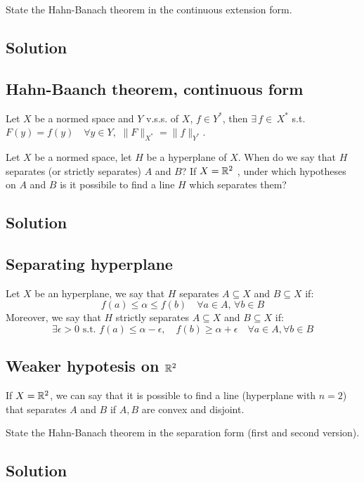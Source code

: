 
\question
State the Hahn-Banach theorem in the continuous extension form.

\subsection*{Solution}

\subsection{Hahn-Baanch theorem, continuous form}
Let $X$ be a normed space and $Y$ v.s.s. of $X$, $f \in Y^*$, then $\exists\,f \in\, X^* $ s.t. $F(y)=f(y)\quad \forall y\in Y$, $\,\|F\|_{X^*}=\|f\|_{Y^*}$. 


\question
Let $X$ be a normed space, let $H$ be a hyperplane of $X$. When do we say that $H$ separates (or strictly separates) $A$ and $B$? If $X = \mathbb{R}^2$ , under which hypotheses on $A$ and $B$ is it possibile to find a line $H$ which separates them?

\subsection*{Solution}

\subsection{Separating hyperplane}
Let $X$ be an hyperplane, we say that $H$ separates $A \subseteq X$ and $B\subseteq X$ if:
\[
f(a) \le \alpha \le f(b) \quad\forall a\in A,\,\forall b \in B
\]
Moreover, we say  that $H$ strictly separates $A \subseteq X$ and $B\subseteq X$ if:
\[
\exists \epsilon>0 \text{ s.t. } f(a) \le \alpha - \epsilon,\quad f(b) \ge \alpha + \epsilon \quad \forall a \in A, \forall b \in B
\]
\subsection{Weaker hypotesis on \texorpdfstring{$\mathbb{R}^2$}{R2}}
If $X= \mathbb{R}^2$, we can say that it is possible to find a line (hyperplane with $n=2$) that separates $A $ and $B$ if $A,B $ are convex and disjoint.


\question
State the Hahn-Banach theorem in the separation form (first and second version).

\subsection*{Solution}

